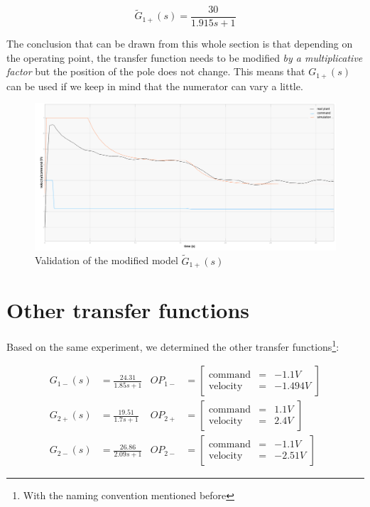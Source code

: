 \begin{equation}
    \tilde{G}_{1+}(s) = \frac{30}{1.915 s + 1}
\end{equation}

The conclusion that can be drawn from this whole section is that depending on the operating point, the transfer function
needs to be modified \textit{by a multiplicative factor} but the position of the pole does not change. This means that 
$G_{1+}(s)$ can be used if we keep in mind that the numerator can vary a little.

\begin{figure}[H]
    \centering
    \includegraphics[width=\textwidth]{Pictures/validation_A0_30.png}
    \caption{Validation of the modified model $\tilde{G}_{1+}(s)$}
    \label{fig:validation_A0_30}
\end{figure}

\section{Other transfer functions}

Based on the same experiment, we determined the other transfer functions\footnote{With the naming convention mentioned 
before}:

\begin{align}
    G_{1-}(s) &= \frac{24.31}{1.85 s + 1} & OP_{1-} &= \begin{bmatrix}
                \text{command} & = & -1.1 V \\
                \text{velocity} & = & -1.494 V
                \end{bmatrix} 
    \label{TF_mot1_-} \\
    G_{2+}(s) &= \frac{19.51}{1.7 s + 1} & OP_{2+} &= \begin{bmatrix}
                \text{command} & = & 1.1 V \\
                \text{velocity} & = & 2.4 V
                \end{bmatrix} 
    \label{TF_mot2_+} \\
    G_{2-}(s) &= \frac{26.86}{2.09 s + 1} & OP_{2-} &= \begin{bmatrix}
                \text{command} & = & -1.1 V \\
                \text{velocity} & = & -2.51 V
                \end{bmatrix} 
    \label{TF_mot2_-}
\end{align}


